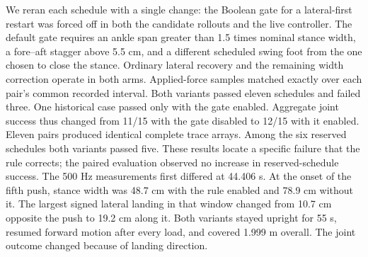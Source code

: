 \noindent We reran each schedule with a single change: the Boolean gate for a lateral-first restart was forced off in both the candidate rollouts and the live controller. The default gate requires an ankle span greater than 1.5 times nominal stance width, a fore--aft stagger above 5.5 cm, and a different scheduled swing foot from the one chosen to close the stance. Ordinary lateral recovery and the remaining width correction operate in both arms. Applied-force samples matched exactly over each pair's common recorded interval.
Both variants passed eleven schedules and failed three. One historical case passed only with the gate enabled. Aggregate joint success thus changed from 11/15 with the gate disabled to 12/15 with it enabled. Eleven pairs produced identical complete trace arrays. Among the six reserved schedules both variants passed five. These results locate a specific failure that the rule corrects; the paired evaluation observed no increase in reserved-schedule success.
The 500 Hz measurements first differed at 44.406 s. At the onset of the fifth push, stance width was 48.7 cm with the rule enabled and 78.9 cm without it. The largest signed lateral landing in that window changed from 10.7 cm opposite the push to 19.2 cm along it. Both variants stayed upright for 55 s, resumed forward motion after every load, and covered 1.999 m overall. The joint outcome changed because of landing direction.
